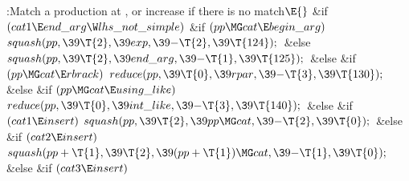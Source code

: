 \par
\Y\B\4:Match a production at , or increase  if there
is no match\X${}\E{}$\6
\&{if} ${}(\\{cat1}\E\\{end\_arg}\W\\{lhs\_not\_simple}){}$\1\6
\&{if} ${}(\\{pp}\MG\\{cat}\E\\{begin\_arg}){}$\1\5
${}\\{squash}(\\{pp},\39\T{2},\39\\{exp},\39{-}\T{2},\39\T{124});{}$\2\6
\&{else}\1\5
${}\\{squash}(\\{pp},\39\T{2},\39\\{end\_arg},\39{-}\T{1},\39\T{125});{}$\2\2\6
\&{else} \&{if} ${}(\\{pp}\MG\\{cat}\E\\{rbrack}){}$\1\5
${}\\{reduce}(\\{pp},\39\T{0},\39\\{rpar},\39{-}\T{3},\39\T{130});{}$\2\6
\&{else} \&{if} ${}(\\{pp}\MG\\{cat}\E\\{using\_like}){}$\1\5
${}\\{reduce}(\\{pp},\39\T{0},\39\\{int\_like},\39{-}\T{3},\39\T{140});{}$\2\6
\&{else} \&{if} ${}(\\{cat1}\E\\{insert}){}$\1\5
${}\\{squash}(\\{pp},\39\T{2},\39\\{pp}\MG\\{cat},\39{-}\T{2},\39\T{0});{}$\2\6
\&{else} \&{if} ${}(\\{cat2}\E\\{insert}){}$\1\5
${}\\{squash}(\\{pp}+\T{1},\39\T{2},\39(\\{pp}+\T{1})\MG\\{cat},\39{-}\T{1},\39%
\T{0});{}$\2\6
\&{else} \&{if} ${}(\\{cat3}\E\\{insert}){}$\1\5
